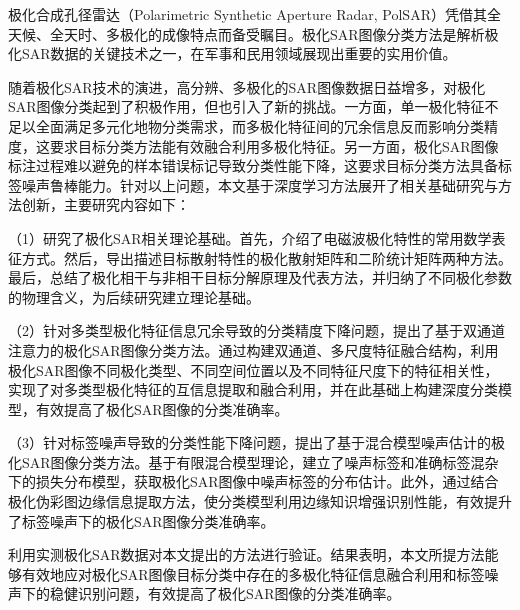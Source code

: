 \begin{chineseabstract}

    极化合成孔径雷达（Polarimetric Synthetic Aperture Radar, PolSAR）凭借其全天候、全天时、多极化的成像特点而备受瞩目。极化SAR图像分类方法是解析极化SAR数据的关键技术之一，在军事和民用领域展现出重要的实用价值。

    随着极化SAR技术的演进，高分辨、多极化的SAR图像数据日益增多，对极化SAR图像分类起到了积极作用，但也引入了新的挑战。一方面，单一极化特征不足以全面满足多元化地物分类需求，而多极化特征间的冗余信息反而影响分类精度，这要求目标分类方法能有效融合利用多极化特征。另一方面，极化SAR图像标注过程难以避免的样本错误标记导致分类性能下降，这要求目标分类方法具备标签噪声鲁棒能力。针对以上问题，本文基于深度学习方法展开了相关基础研究与方法创新，主要研究内容如下：

    （1）研究了极化SAR相关理论基础。首先，介绍了电磁波极化特性的常用数学表征方式。然后，导出描述目标散射特性的极化散射矩阵和二阶统计矩阵两种方法。最后，总结了极化相干与非相干目标分解原理及代表方法，并归纳了不同极化参数的物理含义，为后续研究建立理论基础。

    （2）针对多类型极化特征信息冗余导致的分类精度下降问题，提出了基于双通道注意力的极化SAR图像分类方法。通过构建双通道、多尺度特征融合结构，利用极化SAR图像不同极化类型、不同空间位置以及不同特征尺度下的特征相关性，实现了对多类型极化特征的互信息提取和融合利用，并在此基础上构建深度分类模型，有效提高了极化SAR图像的分类准确率。

    （3）针对标签噪声导致的分类性能下降问题，提出了基于混合模型噪声估计的极化SAR图像分类方法。基于有限混合模型理论，建立了噪声标签和准确标签混杂下的损失分布模型，获取极化SAR图像中噪声标签的分布估计。此外，通过结合极化伪彩图边缘信息提取方法，使分类模型利用边缘知识增强识别性能，有效提升了标签噪声下的极化SAR图像分类准确率。

    利用实测极化SAR数据对本文提出的方法进行验证。结果表明，本文所提方法能够有效地应对极化SAR图像目标分类中存在的多极化特征信息融合利用和标签噪声下的稳健识别问题，有效提高了极化SAR图像的分类准确率。


\end{chineseabstract}